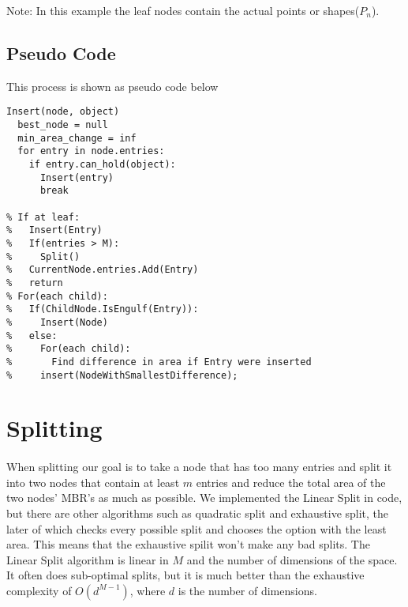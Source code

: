 \documentclass{article}
\begin{document}
\begin{multicols}{2}[]
\begin{minipage}{\linewidth}
\centering
{}

Note: In this example the leaf nodes contain the actual points or shapes($P_n$).
\end{minipage}

\subsection*{Pseudo Code}
This process is shown as pseudo code below


\begin{lstlisting}
Insert(node, object)
  best_node = null
  min_area_change = inf
  for entry in node.entries:
    if entry.can_hold(object):
      Insert(entry)
      break
    
% If at leaf:
%   Insert(Entry)
%   If(entries > M):
%     Split()
%   CurrentNode.entries.Add(Entry)
%   return
% For(each child):
%   If(ChildNode.IsEngulf(Entry)):
%     Insert(Node)
%   else:
%     For(each child):
%       Find difference in area if Entry were inserted
%     insert(NodeWithSmallestDifference);
\end{lstlisting}


\section{Splitting} 

\paragraph{}
When splitting our goal is to take a node that has too many entries and split it into
two nodes that contain at least $m$ entries and reduce the total area of the two nodes'
MBR's as much as possible. We implemented the Linear Split in code, but there are other
algorithms such as quadratic split and exhaustive split, the later of which checks every
possible split and chooses the option with the least area. This means that the exhaustive spilit
won't make any bad splits. The Linear Split algorithm
is linear in $M$ and the number of dimensions of the space. It often does sub-optimal
splits, but it is much better than the exhaustive complexity of $O(d^{M-1})$, where
$d$ is the number of dimensions.


\end{multicols}
\end{document}
